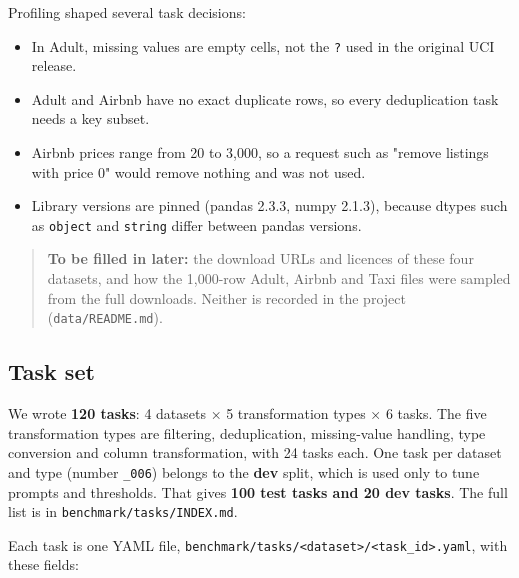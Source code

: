 \documentclass[11pt]{article}
\providecommand{\tightlist}{\setlength{\itemsep}{0pt}\setlength{\parskip}{0pt}}
\begin{document}
Profiling shaped several task decisions:

\begin{itemize}
\tightlist
\item
  In Adult, missing values are empty cells, not the \texttt{?} used in
  the original UCI release.
\item
  Adult and Airbnb have no exact duplicate rows, so every deduplication
  task needs a key subset.
\item
  Airbnb prices range from 20 to 3,000, so a request such as "remove
  listings with price 0" would remove nothing and was not used.
\item
  Library versions are pinned (pandas 2.3.3, numpy 2.1.3), because
  dtypes such as \texttt{object} and \texttt{string} differ between
  pandas versions.
\end{itemize}

\begin{quote}
\textbf{To be filled in later:} the download URLs and licences of these
four datasets, and how the 1,000-row Adult, Airbnb and Taxi files were
sampled from the full downloads. Neither is recorded in the project
(\texttt{data/\allowbreak{}README.\allowbreak{}md}).
\end{quote}

\subsection{Task set}

We wrote \textbf{120 tasks}: 4 datasets × 5 transformation types × 6
tasks. The five transformation types are filtering, deduplication,
missing-value handling, type conversion and column transformation, with
24 tasks each. One task per dataset and type (number
\texttt{\_\allowbreak{}006}) belongs to the \textbf{dev} split, which is
used only to tune prompts and thresholds. That gives \textbf{100 test
tasks and 20 dev tasks}. The full list is in
\texttt{benchmark/\allowbreak{}tasks/\allowbreak{}INDEX.\allowbreak{}md}.

Each task is one YAML file,
\texttt{benchmark/\allowbreak{}tasks/\allowbreak{}<dataset>/\allowbreak{}<task\_\allowbreak{}id>.\allowbreak{}yaml},
with these fields:
\end{document}
